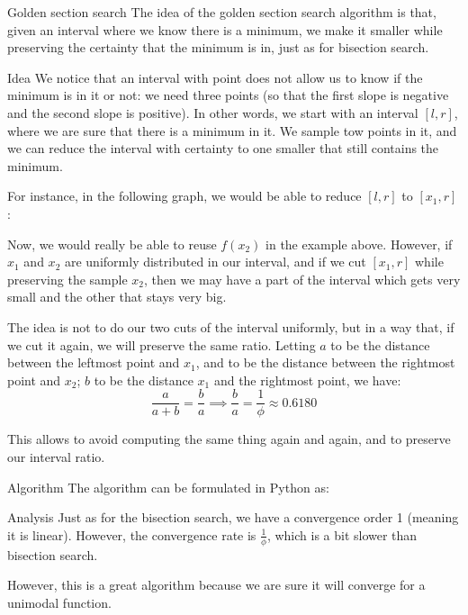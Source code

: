 \documentclass[a4paper]{article}
\begin{document}
\begin{parag}{Golden section search}
    The idea of the golden section search algorithm is that, given an interval where we know there is a minimum, we make it smaller while preserving the certainty that the minimum is in, just as for bisection search.

    \begin{subparag}{Idea}
        We notice that an interval with point does not allow us to know if the minimum is in it or not: we need three points (so that the first slope is negative and the second slope is positive). In other words, we start with an interval $\left[l, r\right]$, where we are sure that there is a minimum in it. We sample tow points in it, and we can reduce the interval with certainty to one smaller that still contains the minimum.

        For instance, in the following graph, we would be able to reduce $\left[l, r\right]$ to $\left[x_1, r\right]$:

        Now, we would really be able to reuse $f\left(x_2\right)$ in the example above. However, if $x_1$ and $x_2$ are uniformly distributed in our interval, and if we cut $\left[x_1, r\right]$ while preserving the sample $x_2$, then we may have a part of the interval which gets very small and the other that stays very big.

        The idea is not to do our two cuts of the interval uniformly, but in a way that, if we cut it again, we will preserve the same ratio. Letting $a$ to be the distance between the leftmost point and $x_1$, and to be the distance between the rightmost point and $x_2$; $b$ to be the distance $x_1$ and the rightmost point, we have:
        \[\frac{a}{a + b} = \frac{b}{a} \implies \frac{b}{a} = \frac{1}{\phi} \approx 0.6180\]

        This allows to avoid computing the same thing again and again, and to preserve our interval ratio.
    \end{subparag}
    
    \begin{subparag}{Algorithm}
        The algorithm can be formulated in Python as:
    \end{subparag}
    

    \begin{subparag}{Analysis}
        Just as for the bisection search, we have a convergence order 1 (meaning it is linear). However, the convergence rate is $\frac{1}{\phi}$, which is a bit slower than bisection search.

        However, this is a great algorithm because we are sure it will converge for a unimodal function.
    \end{subparag}
\end{parag}
\end{document}
